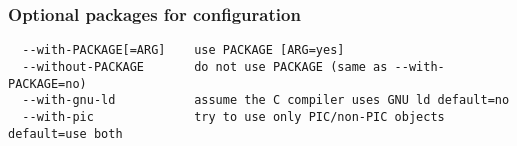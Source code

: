 \subsubsection{Optional packages for configuration}


{\footnotesize
\begin{verbatim}
  --with-PACKAGE[=ARG]    use PACKAGE [ARG=yes]
  --without-PACKAGE       do not use PACKAGE (same as --with-PACKAGE=no)
  --with-gnu-ld           assume the C compiler uses GNU ld default=no
  --with-pic              try to use only PIC/non-PIC objects default=use both
\end{verbatim}
}







